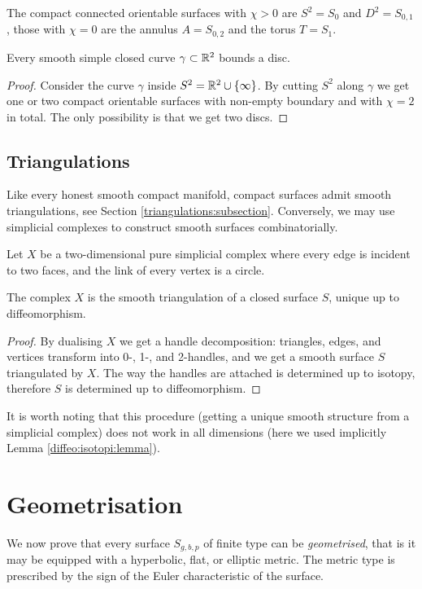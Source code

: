 The compact connected orientable surfaces with $\chi>0$ are $S^2=S_0$ and $D^2=S_{0,1}$, those with $\chi=0$ are the annulus $A=S_{0,2}$ and the torus $T=S_1$.

\begin{cor} \label{Jordan:cor}
Every smooth simple closed curve $\gamma \subset \mathbb{R}^2$ bounds a disc.
\end{cor}
\begin{proof}
Consider the curve $\gamma$ inside $S^2 = \mathbb{R}^2\cup\{\infty\}$. By cutting $S^2$ along $\gamma$ we get one or two compact orientable surfaces with non-empty boundary and with $\chi=2$ in total. The only possibility is that we get two discs.
\end{proof}

\subsection{Triangulations} \label{surface:triangulations:subsection}
Like every honest smooth compact manifold, compact surfaces admit smooth triangulations, see Section \ref{triangulations:subsection}. Conversely, we may use simplicial complexes to construct smooth surfaces combinatorially.

Let $X$ be a two-dimensional pure simplicial complex where every edge is incident to two faces, and the link of every vertex is a circle.

\begin{prop}
The complex $X$ is the smooth triangulation of a closed surface $S$, unique up to diffeomorphism.
\end{prop}
\begin{proof}
By dualising $X$ we get a handle decomposition: triangles, edges, and vertices transform into 0-, 1-, and 2-handles, and we get a smooth surface $S$ triangulated by $X$. The way the handles are attached is determined up to isotopy, therefore $S$ is determined up to diffeomorphism.
\end{proof}

\begin{warning}
It is worth noting that this procedure (getting a unique smooth structure from a simplicial complex) does not work in all dimensions (here we used implicitly Lemma \ref{diffeo:isotopi:lemma}).
\end{warning}

\section{Geometrisation} \label{surface:geometrisation:section}
We now prove that every surface $S_{g,b,p}$ of finite type can be \emph{geometrised}, that is it may be equipped with a hyperbolic, flat, or elliptic metric. The metric type is prescribed by the sign of the Euler characteristic of the surface.

